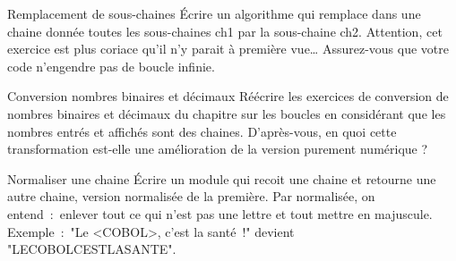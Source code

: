 \begin{Exercice}{Remplacement de sous-chaines}
	Écrire un algorithme 
	qui remplace dans une chaine donnée 
	toutes les sous-chaines ch1 par la sous-chaine ch2. 
	Attention, 
	cet exercice est plus coriace qu'il n'y parait à première vue\dots 
	Assurez-vous que votre code n'engendre pas de boucle infinie. 
\end{Exercice}

\begin{Exercice}{Conversion nombres binaires et décimaux}
	Réécrire les exercices de conversion de nombres binaires et décimaux
	du chapitre sur les boucles 
	en considérant que les nombres entrés et affichés sont des chaines. 
	D'après-vous, 
	en quoi cette transformation 
	est-elle une amélioration de la version purement numérique ?
\end{Exercice}

\begin{Exercice}{Normaliser une chaine}
	Écrire un module qui recoit une chaine et retourne une autre chaine,
	version normalisée de la première.
	Par normalisée, on entend~:~enlever tout ce qui n'est pas une lettre 
	et tout mettre en majuscule.
	\\Exemple~:~"Le <COBOL>, c'est la santé~!" devient "LECOBOLCESTLASANTE".
\end{Exercice}

